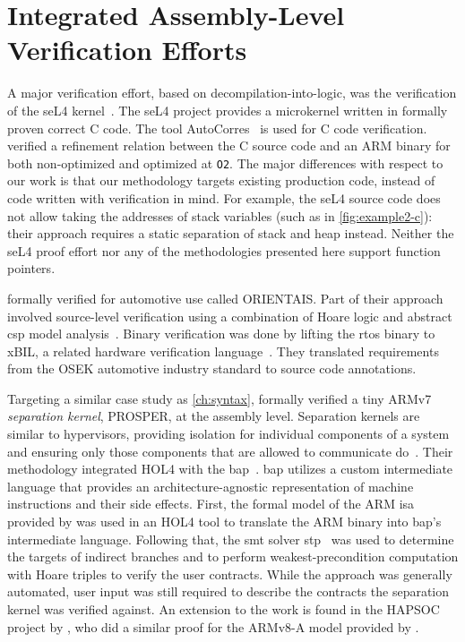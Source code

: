 \section{Integrated Assembly-Level Verification Efforts}\label{se:integrated_assembly}
A major verification effort, based on decompilation-into-logic,
was the verification of the seL4 kernel~\citep{klein2009sel4,Klein_AEMSKH_14}.
The seL4 project provides a microkernel written in formally proven correct C code.
The tool AutoCorres~\citep{greenaway2012bridging} is used for C code verification.
\citet{sewell2013tvv} verified a refinement relation between the C source code
and an ARM binary for both non-optimized and optimized at \lstinline{O2}.
The major differences with respect to our work
is that our methodology targets existing production code,
instead of code written with verification in mind.
For example, the seL4 source code does not allow taking the addresses of stack variables
(such as in \cref{fig:example2-c}):
their approach requires a static separation of stack and heap instead.
Neither the seL4 proof effort nor any of the methodologies presented here
support function pointers.

\citet{shi2012orientais} formally verified  for automotive use
called ORIENTAIS.
Part of their approach involved source-level verification
using a combination of Hoare logic
and abstract \ac{csp} model analysis~\citep{hoare1978csp}.
Binary verification was done by lifting the \ac{rtos} binary to xBIL,
a related hardware verification language~\citep{shi2012xbil}.
They translated requirements from the OSEK automotive industry standard
to source code annotations.

Targeting a similar case study as \cref{ch:syntax},
\citet{dam2013hypervisor,dam2013formal}
formally verified a tiny ARMv7 \emph{separation kernel},%
PROSPER, at the assembly level.
Separation kernels are similar to hypervisors,
providing isolation for individual components of a system and ensuring
only those components that are allowed to communicate do~\citep{rushby1981dvss}.
Their methodology integrated HOL4 with the \ac{bap}~\citep{brumley2011bap}.
\Ac{bap} utilizes a custom intermediate language
that provides an architecture-agnostic representation of machine instructions
and their side effects.
First, the formal model of the ARM \ac{isa} provided by \citet{fox2010arm} was used
in an HOL4 tool to translate the ARM binary into \ac{bap}'s intermediate language.
Following that, the \ac{smt} solver \ac{stp}~\citep{ganesh2007stp}
was used to determine the targets of indirect branches
and to perform weakest-precondition computation with Hoare triples
to verify the user contracts.
While the approach was generally automated,
user input was still required to describe the contracts
the separation kernel was verified against.
An extension to the work is found in the HAPSOC project by \citet{baumann2016high},
who did a similar proof for the ARMv8-A model provided by \citet{fox2015improved}.

